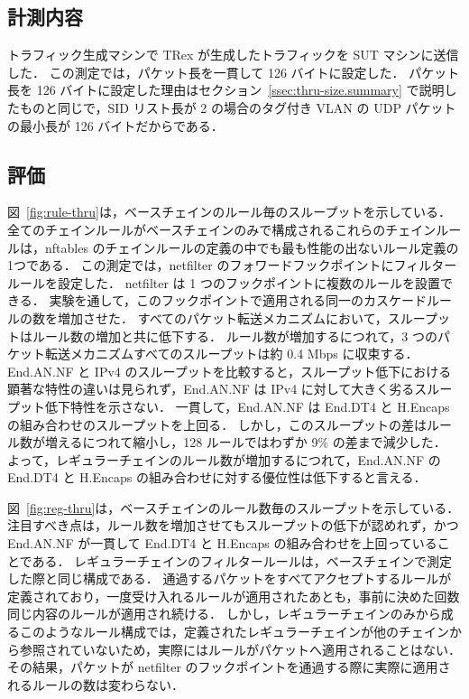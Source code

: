\subsection{計測内容}
\label{ssec:thru-chains.summary}
トラフィック生成マシンで TRex が生成したトラフィックを SUT マシンに送信した．
この測定では，パケット長を一貫して 126 バイトに設定した．
パケット長を 126 バイトに設定した理由はセクション~\ref{ssec:thru-size.summary} で説明したものと同じで，SID リスト長が 2 の場合のタグ付き VLAN の UDP パケットの最小長が 126 バイトだからである．

\subsection{評価}
\label{ssec:thru-chains.eval}
図~\ref{fig:rule-thru}は，ベースチェインのルール毎のスループットを示している．
全てのチェインルールがベースチェインのみで構成されるこれらのチェインルールは，nftables のチェインルールの定義の中でも最も性能の出ないルール定義の1つである．
この測定では，netfilter のフォワードフックポイントにフィルタールールを設定した．
netfilter は 1 つのフックポイントに複数のルールを設置できる．
実験を通して，このフックポイントで適用される同一のカスケードルールの数を増加させた．
すべてのパケット転送メカニズムにおいて，スループットはルール数の増加と共に低下する．
ルール数が増加するにつれて，3 つのパケット転送メカニズムすべてのスループットは約 0.4 Mbps に収束する．
End.AN.NF と IPv4 のスループットを比較すると，スループット低下における顕著な特性の違いは見られず，End.AN.NF は IPv4 に対して大きく劣るスループット低下特性を示さない．
一貫して，End.AN.NF は End.DT4 と H.Encaps の組み合わせのスループットを上回る．
しかし，このスループットの差はルール数が増えるにつれて縮小し，128 ルールではわずか 9\% の差まで減少した．
よって，レギュラーチェインのルール数が増加するにつれて，End.AN.NF の End.DT4 と H.Encaps の組み合わせに対する優位性は低下すると言える．

図~\ref{fig:reg-thru}は，ベースチェインのルール数毎のスループットを示している．
注目すべき点は，ルール数を増加させてもスループットの低下が認めれず，かつ End.AN.NF が一貫して End.DT4 と H.Encaps の組み合わせを上回っていることである．
レギュラーチェインのフィルタールールは，ベースチェインで測定した際と同じ構成である．
通過するパケットをすべてアクセプトするルールが定義されており，一度受け入れるルールが適用されたあとも，事前に決めた回数同じ内容のルールが適用され続ける．
しかし，レギュラーチェインのみから成るこのようなルール構成では，定義されたレギュラーチェインが他のチェインから参照されていないため，実際にはルールがパケットへ適用されることはない．
その結果，パケットが netfilter のフックポイントを通過する際に実際に適用されるルールの数は変わらない．

